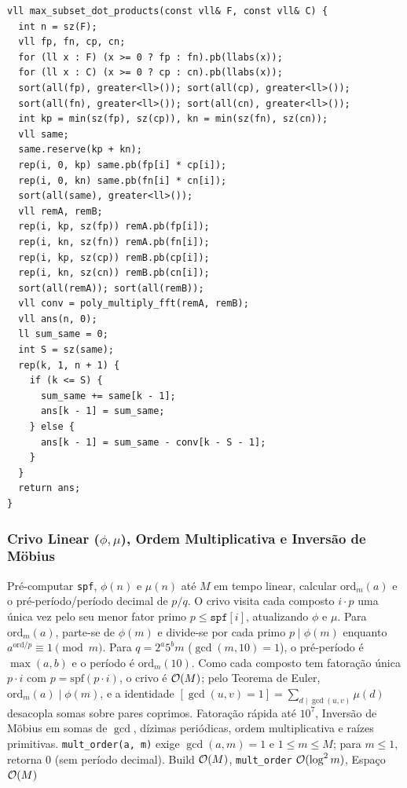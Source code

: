 \begin{lstlisting}
vll max_subset_dot_products(const vll& F, const vll& C) {
  int n = sz(F);
  vll fp, fn, cp, cn;
  for (ll x : F) (x >= 0 ? fp : fn).pb(llabs(x));
  for (ll x : C) (x >= 0 ? cp : cn).pb(llabs(x));
  sort(all(fp), greater<ll>()); sort(all(cp), greater<ll>());
  sort(all(fn), greater<ll>()); sort(all(cn), greater<ll>());
  int kp = min(sz(fp), sz(cp)), kn = min(sz(fn), sz(cn));
  vll same;
  same.reserve(kp + kn);
  rep(i, 0, kp) same.pb(fp[i] * cp[i]);
  rep(i, 0, kn) same.pb(fn[i] * cn[i]);
  sort(all(same), greater<ll>());
  vll remA, remB;
  rep(i, kp, sz(fp)) remA.pb(fp[i]);
  rep(i, kn, sz(fn)) remA.pb(fn[i]);
  rep(i, kp, sz(cp)) remB.pb(cp[i]);
  rep(i, kn, sz(cn)) remB.pb(cn[i]);
  sort(all(remA)); sort(all(remB));
  vll conv = poly_multiply_fft(remA, remB);
  vll ans(n, 0);
  ll sum_same = 0;
  int S = sz(same);
  rep(k, 1, n + 1) {
    if (k <= S) {
      sum_same += same[k - 1];
      ans[k - 1] = sum_same;
    } else {
      ans[k - 1] = sum_same - conv[k - S - 1];
    }
  }
  return ans;
}
\end{lstlisting}

\subsubsection{Crivo Linear ($\phi, \mu$), Ordem Multiplicativa e Inversão de Möbius}
\algobox
  {Pré-computar \texttt{spf}, $\phi(n)$ e $\mu(n)$ até $M$ em tempo linear, calcular $\text{ord}_m(a)$ e o pré-período/período decimal de $p/q$.}
  {O crivo visita cada composto $i \cdot p$ uma única vez pelo seu menor fator primo $p \le \texttt{spf}[i]$, atualizando $\phi$ e $\mu$. Para $\text{ord}_m(a)$, parte-se de $\phi(m)$ e divide-se por cada primo $p \mid \phi(m)$ enquanto $a^{\text{ord}/p} \equiv 1 \pmod m$. Para $q = 2^a 5^b m$ ($\gcd(m, 10) = 1$), o pré-período é $\max(a, b)$ e o período é $\text{ord}_m(10)$.}
  {Como cada composto tem fatoração única $p \cdot i$ com $p = \text{spf}(p \cdot i)$, o crivo é $\mathcal{O}(M)$; pelo Teorema de Euler, $\text{ord}_m(a) \mid \phi(m)$, e a identidade $[\gcd(u,v)=1] = \sum_{d \mid \gcd(u,v)} \mu(d)$ desacopla somas sobre pares coprimos.}
  {Fatoração rápida até $10^7$, Inversão de Möbius em somas de $\gcd$, dízimas periódicas, ordem multiplicativa e raízes primitivas.}
  {\texttt{mult\_order(a, m)} exige $\gcd(a, m) = 1$ e $1 \le m \le M$; para $m \le 1$, retorna $0$ (sem período decimal).}
  {Build $\mathcal{O}(M)$, \texttt{mult\_order} $\mathcal{O}(\log^2 m)$, Espaço $\mathcal{O}(M)$}

